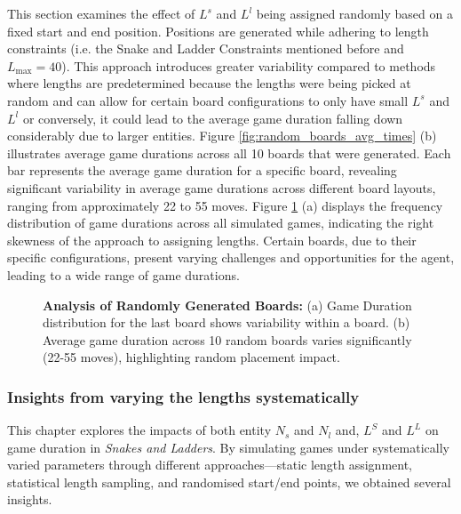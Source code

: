 This section examines the effect of $L^s$ and $L^l$ being assigned randomly based on a fixed start and end position. Positions are generated while adhering to length constraints (i.e. the Snake and Ladder Constraints mentioned before and $L_{\text{max}} = 40$). This approach introduces greater variability compared to methods where lengths are predetermined because the lengths were being picked at random and can allow for certain board configurations to only have small $L^s$ and $L^l$ or conversely, it could lead to the average game duration falling down considerably due to larger entities. Figure \ref{fig:random_boards_avg_times} (b) illustrates average game durations across all 10 boards that were generated. Each bar represents the average game duration for a specific board, revealing significant variability in average game durations across different board layouts, ranging from approximately 22 to 55 moves. Figure \ref{fig:random_boards_game_dist} (a) displays the frequency distribution of game durations across all simulated games, indicating the right skewness of the approach to assigning lengths. Certain boards, due to their specific configurations, present varying challenges and opportunities for the agent, leading to a wide range of game durations.

\begin{figure}[ht]
	\centering
	\linebreak
	\caption{\textbf{Analysis of Randomly Generated Boards:} (a) Game Duration distribution for the last board shows variability within a board. (b) Average game duration across 10 random boards varies significantly (22-55 moves), highlighting random placement impact.}
	\label{fig:random_boards_avg_times}
	\label{fig:random_boards_game_dist}
\end{figure}


\subsubsection{Insights from varying the lengths systematically}

This chapter explores the impacts of both entity $N_s$ and $N_l$ and, $L^S$ and $L^L$ on game duration in \textit{Snakes and Ladders}. By simulating games under systematically varied parameters through different approaches—static length assignment, statistical length sampling, and randomised start/end points, we obtained several insights.

